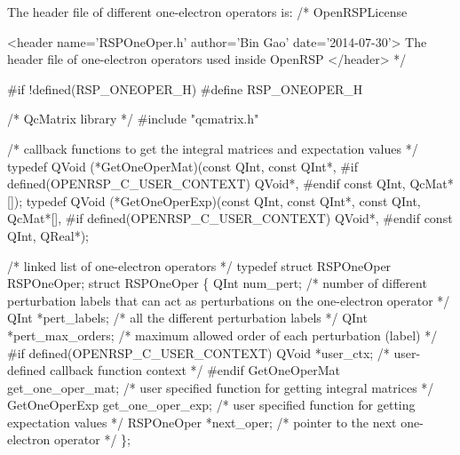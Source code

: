 The header file of different one-electron operators is:
\nwenddocs{}\endmoddef
/*
  \LA{}OpenRSPLicense~{\nwtagstyle{}}\RA{}

  <header name='RSPOneOper.h' author='Bin Gao' date='2014-07-30'>
    The header file of one-electron operators used inside OpenRSP
  </header>
*/

#if !defined(RSP_ONEOPER_H)
#define RSP_ONEOPER_H

/* QcMatrix library */
#include "qcmatrix.h"

/* callback functions to get the integral matrices and expectation values */
typedef QVoid (*GetOneOperMat)(const QInt,
                               const QInt*,
#if defined(OPENRSP_C_USER_CONTEXT)
                               QVoid*,
#endif
                               const QInt,
                               QcMat*[]);
typedef QVoid (*GetOneOperExp)(const QInt,
                               const QInt*,
                               const QInt,
                               QcMat*[],
#if defined(OPENRSP_C_USER_CONTEXT)
                               QVoid*,
#endif
                               const QInt,
                               QReal*);

/* linked list of one-electron operators */
typedef struct RSPOneOper RSPOneOper;
struct RSPOneOper \{
    QInt num_pert;                   /* number of different perturbation labels that
                                        can act as perturbations on the one-electron operator */
    QInt *pert_labels;               /* all the different perturbation labels */
    QInt *pert_max_orders;           /*  maximum allowed order of each perturbation (label) */
#if defined(OPENRSP_C_USER_CONTEXT)
    QVoid *user_ctx;                 /* user-defined callback function context */
#endif
    GetOneOperMat get_one_oper_mat;  /* user specified function for getting integral matrices */
    GetOneOperExp get_one_oper_exp;  /* user specified function for getting expectation values */
    RSPOneOper *next_oper;           /* pointer to the next one-electron operator */
\};

